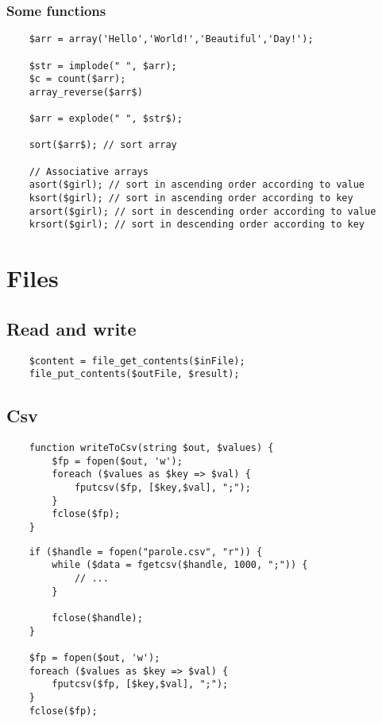 \documentclass[a4paper]{article}
\begin{document}
\subsubsection{Some functions}

\begin{lstlisting}
    $arr = array('Hello','World!','Beautiful','Day!');
    
    $str = implode(" ", $arr);
    $c = count($arr);
    array_reverse($arr$)

    $arr = explode(" ", $str$);

    sort($arr$); // sort array

    // Associative arrays
    asort($girl); // sort in ascending order according to value
    ksort($girl); // sort in ascending order according to key
    arsort($girl); // sort in descending order according to value
    krsort($girl); // sort in descending order according to key
\end{lstlisting}

\section{Files}

\subsection{Read and write}

\begin{lstlisting}
    $content = file_get_contents($inFile);
    file_put_contents($outFile, $result);
\end{lstlisting}

\subsection{Csv}

\begin{lstlisting}
    function writeToCsv(string $out, $values) {
        $fp = fopen($out, 'w');
        foreach ($values as $key => $val) {
            fputcsv($fp, [$key,$val], ";");
        }
        fclose($fp);
    }
\end{lstlisting}

\begin{lstlisting}
    if ($handle = fopen("parole.csv", "r")) {
        while ($data = fgetcsv($handle, 1000, ";")) {
            // ...
        }
    
        fclose($handle);
    }

    $fp = fopen($out, 'w');
    foreach ($values as $key => $val) {
        fputcsv($fp, [$key,$val], ";");
    }
    fclose($fp);
\end{lstlisting}
\end{document}
